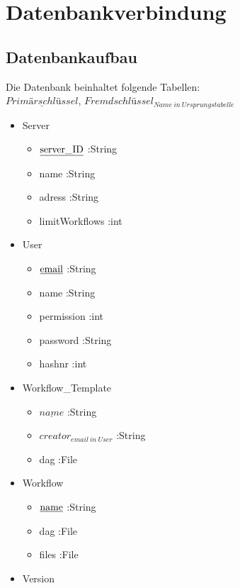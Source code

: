 \section{Datenbankverbindung}

\subsection{Datenbankaufbau}
Die Datenbank beinhaltet folgende Tabellen:\\
\textnormal{$\underline{Primärschlüssel}$},
\textnormal{$Fremdschlüssel_{Name\:in\:Ursprungstabelle}$}

\begin{itemize}[noitemsep]
	\item Server
	\begin{itemize}[noitemsep]
		\item $\textnormal{\underline{server\_ID}}$ :String
		\item name :String
		\item adress :String
		\item limitWorkflows :int
	\end{itemize}
	\item User
	\begin{itemize}[noitemsep]
		\item $\textnormal{\underline{email}}$ :String
		\item name :String
		\item permission :int
		\item password :String
		\item hashnr :int
	\end{itemize}
	\item Workflow\_Template
	\begin{itemize}[noitemsep]
		\item \textnormal{$\underline{name}$} :String
		\item \textnormal{$creator_{email\:in\:User}$} :String
		\item dag :File
	\end{itemize}
	\item Workflow
	\begin{itemize}[noitemsep]
		\item $\textnormal{\underline{name}}$ :String
		\item dag :File
		\item files :File
	\end{itemize}
	\item Version

\end{itemize}
